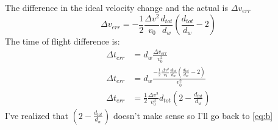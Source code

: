 \documentclass[12pt,letterpaper]{letter}
\newcommand{\dv}{\Delta v}
\begin{document}
The difference in the ideal velocity change and the actual is $\dv_{err}$
\begin{equation}
   \dv_{err} =  - \frac{1}{2} \frac{\dv^2}{v_0}\frac{d_{tot}}{d_w}\left( \frac{d_{tot}}{d_w}-2 \right)
   \label{dverr}
\end{equation}
The time of flight difference is:
\begin{align}
   \Delta t_{err} &= d_w \frac{\dv_{err}}{v_0^2} \\
   \Delta t_{err} &= d_w \frac{ - \frac{1}{2} \frac{\dv^2}{v_0}\frac{d_{tot}}{d_w}\left( \frac{d_{tot}}{d_w}-2 \right)}{v_0^2} \\
   \Delta t_{err} &= \frac{1}{2} \frac{\dv^2}{v_0^3} d_{tot} \left(2 -  \frac{d_{tot}}{d_w} \right)
\end{align}
I've realized that $\left(2 -  \frac{d_{tot}}{d_w} \right)$ doesn't make sense so I'll go back to \eqref{eq:b}
\end{document}
